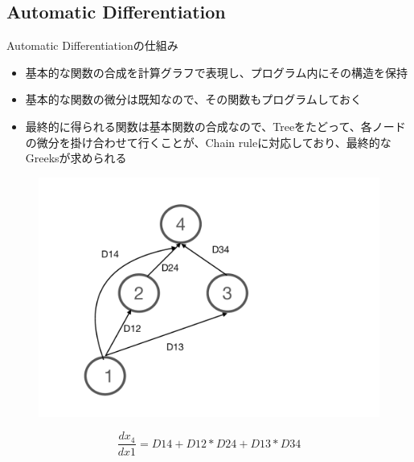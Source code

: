 \documentclass[driverfallback=dvipdfmx,cjk]{beamer}
\begin{document}
\subsection{Automatic Differentiation}
\begin{frame}
    Automatic Differentiationの仕組み
    \begin{itemize}
        \item 基本的な関数の合成を計算グラフで表現し、プログラム内にその構造を保持
        \item 基本的な関数の微分は既知なので、その関数もプログラムしておく
        \item 最終的に得られる関数は基本関数の合成なので、Treeをたどって、各ノードの微分を掛け合わせて行くことが、Chain ruleに対応しており、最終的なGreeksが求められる
    \end{itemize}
\end{frame}

\begin{frame}
    \begin{figure}
    \includegraphics[scale=0.4]{AADImage.pdf}
    \end{figure}
    $$ \frac{d x_4}{d x1} = D14 + D12 * D24 + D13 * D34$$
\end{frame}
\end{document}
